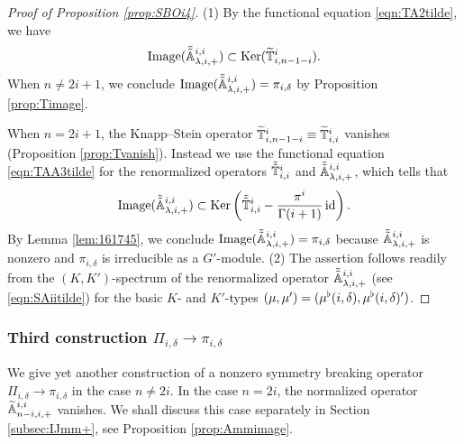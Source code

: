 \begin{proof}
[Proof of Proposition \ref{prop:SBOi4}]
(1)\enspace
By the functional equation \eqref{eqn:TA2tilde}, 
we have
\[
  {\operatorname{Image}}(\tilde{\tilde{{\mathbb{A}}}}_{{\lambda},{i},{+}}^{{i,i}})
 \subset {\operatorname{Ker}} (\widetilde{{\mathbb{T}}}_{{i},{n-1-i}}^{{i}}).  
\]
When $n \ne 2i+1$, 
 we conclude 
 ${\operatorname{Image}}(\tilde{\tilde{{\mathbb{A}}}}_{{\lambda},{i},{+}}^{{i,i}})=\pi_{i,\delta}$
 by Proposition \ref{prop:Timage}.  


When $n=2i+1$, 
 the Knapp--Stein operator $\widetilde{{\mathbb{T}}}_{{i},{n-1-i}}^{{i}}\equiv \widetilde{{\mathbb{T}}}_{{i},{i}}^{{i}}$ vanishes 
 (Proposition \ref{prop:Tvanish}).  
Instead we use the functional equation \eqref{eqn:TAA3tilde}
 for the renormalized operators $\tilde{\tilde{{\mathbb{T}}}}_{{i},{i}}^{{i}}$ and $\tilde{\tilde{{\mathbb{A}}}}_{{\lambda},{i},{+}}^{{i,i}}$, 
 which tells
 that
\[
   {\operatorname{Image}}(\tilde{\tilde{{\mathbb{A}}}}_{{\lambda},{i},{+}}^{{i,i}})
   \subset {\operatorname{Ker}} 
   \left(\tilde{\tilde{{\mathbb{T}}}}_{{i},{i}}^{{i}} - \frac{\pi^i}{\Gamma(i+1)}\, {\operatorname{id}}\right).  
\]
By Lemma \ref{lem:161745}, 
 we conclude 
$
 {\operatorname{Image}}(\tilde{\tilde{{\mathbb{A}}}}_{{\lambda},{i},{+}}^{{i,i}})=\pi_{i,\delta} 
$
 because $\tilde{\tilde{{\mathbb{A}}}}_{{\lambda},{i},{+}}^{{i,i}}$ is nonzero
 and $\pi_{i,\delta}$ is irreducible as a $G'$-module.  
\newline\noindent
(2)\enspace
The assertion follows readily from the $(K,K')$-spectrum
 of the renormalized operator $\tilde{\tilde{{\mathbb{A}}}}_{{\lambda},{i},{+}}^{{i,i}}$
 (see \eqref{eqn:SAiitilde})
 for the basic $K$- and $K'$-types
 $(\mu,\mu')=(\mu^{\flat}(i,\delta),\mu^{\flat}(i,\delta)')$.  
\end{proof}





\subsubsection{Third construction $\Pi_{i,\delta} \to \pi_{i,\delta}$}
\label{subsec:3irrIJ}



We give yet another construction
 of a nonzero symmetry breaking operator
 $\Pi_{i,\delta} \to \pi_{i,\delta}$
 in the case $n \ne 2i$.  
In the case $n=2i$, 
 the normalized operator 
 ${\widetilde{\mathbb{A}}}_{{n-i},{i},{+}}^{{i,i}}$ vanishes.  
We shall discuss this case separately
 in Section \ref{subsec:IJmm+}, 
see Proposition \ref{prop:Ammimage}.  

